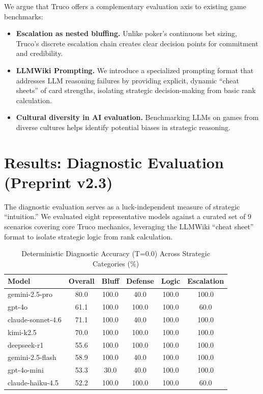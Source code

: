 \documentclass[11pt]{article}
\begin{document}
We argue that Truco offers a complementary evaluation axis to existing game benchmarks:
\begin{itemize}
    \item \textbf{Escalation as nested bluffing.} Unlike poker's continuous bet sizing, Truco's discrete escalation chain creates clear decision points for commitment and credibility.
    \item \textbf{LLMWiki Prompting.} We introduce a specialized prompting format that addresses LLM reasoning failures by providing explicit, dynamic ``cheat sheets'' of card strengths, isolating strategic decision-making from basic rank calculation.
    \item \textbf{Cultural diversity in AI evaluation.} Benchmarking LLMs on games from diverse cultures helps identify potential biases in strategic reasoning.    
\end{itemize}

\section{Results: Diagnostic Evaluation (Preprint v2.3)}

The diagnostic evaluation serves as a luck-independent measure of strategic ``intuition.'' We evaluated eight representative models against a curated set of 9 scenarios covering core Truco mechanics, leveraging the LLMWiki ``cheat sheet'' format to isolate strategic logic from rank calculation.

\begin{table}[ht]
\centering
\caption{Deterministic Diagnostic Accuracy (T=0.0) Across Strategic Categories (\%)}
\label{tab:diagnostics}
\begin{tabular}{@{}lccccc@{}}
\toprule
Model & Overall & Bluff & Defense & Logic & Escalation \\ 
\midrule
gemini-2.5-pro & 80.0 & 100.0 & 40.0 & 100.0 & 100.0 \\ 
gpt-4o & 61.1 & 100.0 & 100.0 & 100.0 & 60.0 \\ 
claude-sonnet-4.6 & 71.1 & 100.0 & 40.0 & 100.0 & 100.0 \\
kimi-k2.5 & 70.0 & 100.0 & 100.0 & 100.0 & 100.0 \\
deepseek-r1 & 55.6 & 100.0 & 100.0 & 100.0 & 100.0 \\
gemini-2.5-flash & 58.9 & 100.0 & 40.0 & 100.0 & 100.0 \\
gpt-4o-mini & 53.3 & 30.0 & 40.0 & 100.0 & 100.0 \\
claude-haiku-4.5 & 52.2 & 100.0 & 100.0 & 100.0 & 60.0 \\
\bottomrule
\end{tabular}
\end{table}
\end{document}
